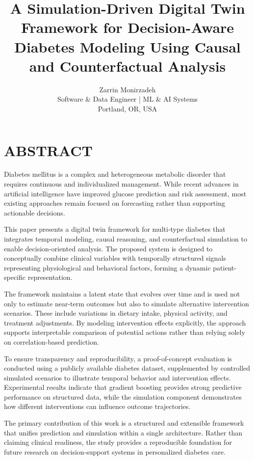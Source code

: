 \documentclass[journal]{IEEEtran}
\begin{document}
\title{\LARGE \bfseries
A Simulation-Driven Digital Twin Framework for Decision-Aware Diabetes Modeling Using Causal and Counterfactual Analysis}
\author{
\Large Zarrin Monirzadeh\\[0.6em]
\normalsize Software \& Data Engineer | ML \& AI Systems\\
\normalsize Portland, OR, USA
}
\maketitle

\section*{\centering ABSTRACT}
\noindent
Diabetes mellitus is a complex and heterogeneous metabolic disorder that requires continuous and individualized management. While recent advances in artificial intelligence have improved glucose prediction and risk assessment, most existing approaches remain focused on forecasting rather than supporting actionable decisions.

This paper presents a digital twin framework for multi-type diabetes that integrates temporal modeling, causal reasoning, and counterfactual simulation to enable decision-oriented analysis. The proposed system is designed to conceptually combine clinical variables with temporally structured signals representing physiological and behavioral factors, forming a dynamic patient-specific representation.

The framework maintains a latent state that evolves over time and is used not only to estimate near-term outcomes but also to simulate alternative intervention scenarios. These include variations in dietary intake, physical activity, and treatment adjustments. By modeling intervention effects explicitly, the approach supports interpretable comparison of potential actions rather than relying solely on correlation-based prediction.

To ensure transparency and reproducibility, a proof-of-concept evaluation is conducted using a publicly available diabetes dataset, supplemented by controlled simulated scenarios to illustrate temporal behavior and intervention effects. Experimental results indicate that gradient boosting provides strong predictive performance on structured data, while the simulation component demonstrates how different interventions can influence outcome trajectories.

The primary contribution of this work is a structured and extensible framework that unifies prediction and simulation within a single architecture. Rather than claiming clinical readiness, the study provides a reproducible foundation for future research on decision-support systems in personalized diabetes care.
\end{document}
